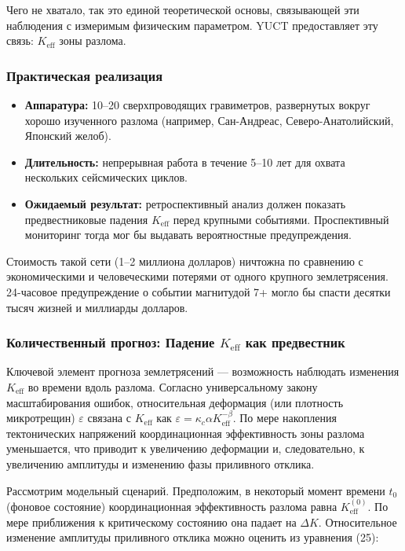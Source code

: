 \documentclass[12pt,a4paper]{article}
\theoremstyle{remark}
\begin{document}
	Чего не хватало, так это единой теоретической основы, связывающей эти наблюдения с измеримым физическим параметром. YUCT предоставляет эту связь: \(K_{\mathrm{eff}}\) зоны разлома.
	
	\subsubsection{Практическая реализация}
	
	\begin{itemize}
		\item \textbf{Аппаратура:} 10–20 сверхпроводящих гравиметров, развернутых вокруг хорошо изученного разлома (например, Сан-Андреас, Северо-Анатолийский, Японский желоб).
		\item \textbf{Длительность:} непрерывная работа в течение 5–10 лет для охвата нескольких сейсмических циклов.
		\item \textbf{Ожидаемый результат:} ретроспективный анализ должен показать предвестниковые падения \(K_{\mathrm{eff}}\) перед крупными событиями. Проспективный мониторинг тогда мог бы выдавать вероятностные предупреждения.
	\end{itemize}
	
	Стоимость такой сети (1–2 миллиона долларов) ничтожна по сравнению с экономическими и человеческими потерями от одного крупного землетрясения. 24-часовое предупреждение о событии магнитудой 7+ могло бы спасти десятки тысяч жизней и миллиарды долларов.
	
	\subsubsection{Количественный прогноз: Падение \(K_{\mathrm{eff}}\) как предвестник}
	\label{subsubsec:precursor}
	
	Ключевой элемент прогноза землетрясений — возможность наблюдать изменения \(K_{\mathrm{eff}}\) во времени вдоль разлома. Согласно универсальному закону масштабирования ошибок, относительная деформация (или плотность микротрещин) \(\varepsilon\) связана с \(K_{\mathrm{eff}}\) как \(\varepsilon = \kappa_c \alpha K_{\mathrm{eff}}^{-\beta}\). По мере накопления тектонических напряжений координационная эффективность зоны разлома уменьшается, что приводит к увеличению деформации и, следовательно, к увеличению амплитуды и изменению фазы приливного отклика.
	
	Рассмотрим модельный сценарий. Предположим, в некоторый момент времени \(t_0\) (фоновое состояние) координационная эффективность разлома равна \(K_{\mathrm{eff}}^{(0)}\). По мере приближения к критическому состоянию она падает на \(\Delta K\). Относительное изменение амплитуды приливного отклика можно оценить из уравнения (25):
	
\end{document}
